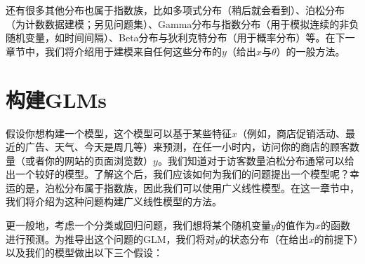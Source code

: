 还有很多其他分布也属于指数族，比如多项式分布（稍后就会看到）、泊松分布（为计数数据建模；另见问题集）、Gamma分布与指数分布（用于模拟连续的非负随机变量，如时间间隔）、Beta分布与狄利克特分布（用于概率分布）等。在下一章节中，我们将介绍用于建模来自任何这些分布的$y$（给出$x$与$\theta$）的一般方法。

\section{构建GLMs}

假设你想构建一个模型，这个模型可以基于某些特征$x$（例如，商店促销活动、最近的广告、天气、今天是周几等）来预测，在任一小时内，访问你的商店的顾客数量（或者你的网站的页面浏览数）$y$。我们知道对于访客数量泊松分布通常可以给出一个较好的模型。了解这个后，我们应该如何为我们的问题提出一个模型呢？幸运的是，泊松分布属于指数族，因此我们可以使用广义线性模型。在这一章节中，我们将介绍为这种问题构建广义线性模型的方法。

更一般地，考虑一个分类或回归问题，我们想将某个随机变量$y$的值作为$x$的函数进行预测。为推导出这个问题的GLM，我们将对$y$的状态分布（在给出$x$的前提下）以及我们的模型做出以下三个假设：
